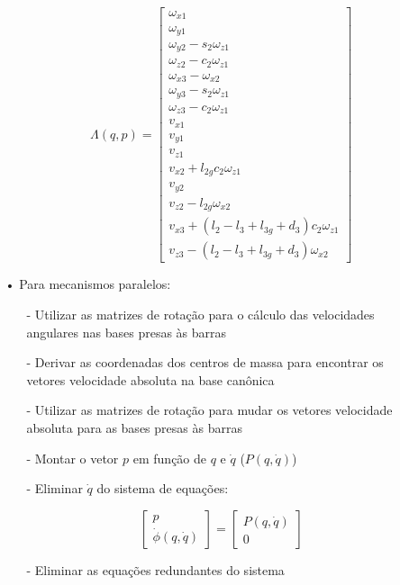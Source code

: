 \documentclass[12pt,a4paper]{article}
\begin{document}
\begin{itemize}
\begin{itemize}
\begin{itemize}
$$
\Lambda(q,p) =
\begin{bmatrix}
\omega_{x1} \\
\omega_{y1} \\
\omega_{y2} - s_2 \omega_{z1} \\
\omega_{z2} - c_2 \omega_{z1} \\
\omega_{x3} - \omega_{x2} \\
\omega_{y3} - s_2 \omega_{z1} \\
\omega_{z3} - c_2 \omega_{z1} \\
v_{x1} \\
v_{y1} \\
v_{z1} \\
v_{x2} + l_{2g} c_2 \omega_{z1} \\
v_{y2} \\
v_{z2} - l_{2g} \omega_{x2} \\
v_{x3} + (l_2 - l_3 + l_{3g} + d_3) c_2 \omega_{z1} \\
v_{z3} - (l_2 - l_3 + l_{3g} + d_3) \omega_{x2}
\end{bmatrix}
$$
\end{itemize}

\item[•] Para mecanismos paralelos:

	\begin{itemize}
	\item[-] Utilizar as matrizes de rotação para o cálculo das velocidades angulares nas bases presas às barras
	\item[-] Derivar as coordenadas dos centros de massa para encontrar os vetores velocidade absoluta na base canônica
	\item[-] Utilizar as matrizes de rotação para mudar os vetores velocidade absoluta para as bases presas às barras
	\item[-] Montar o vetor $p$ em função de $q$ e $\dot{q}$ ($P (q, \dot{q} )$)
	\item[-] Eliminar $\dot{q}$ do sistema de equações:
	
	$$
	\begin{bmatrix}
	p \\
	\dot{\phi} (q, \dot{q} )
	\end{bmatrix}
	=
	\begin{bmatrix}
	P (q, \dot{q} ) \\
	0
	\end{bmatrix}
	$$
	
	\item[-] Eliminar as equações redundantes do sistema
	

\end{itemize}
\end{itemize}
\end{itemize}
\end{document}
